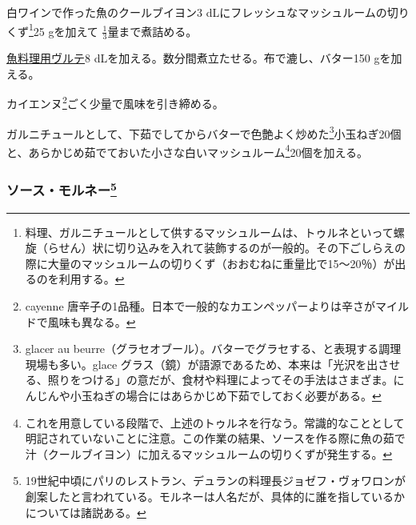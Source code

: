 \begin{recette}


白ワインで作った魚のクールブイヨン3
dLにフレッシュなマッシュルームの切りくず\footnote{料理、ガルニチュールとして供するマッシュルームは、トゥルネといって螺旋（らせん）状に切り込みを入れて装飾するのが一般的。その下ごしらえの際に大量のマッシュルームの切りくず（おおむねに重量比で15〜20％）が出るのを利用する。}25
gを加えて \(\frac{1}{3}\)量まで煮詰める。

\protect\hyperlink{veloute-de-poisson}{魚料理用ヴルテ}8
dLを加える。数分間煮立たせる。布で漉し、バター150 gを加える。

カイエンヌ\footnote{cayenne
  唐辛子の1品種。日本で一般的なカエンペッパーよりは辛さがマイルドで風味も異なる。}ごく少量で風味を引き締める。

ガルニチュールとして、下茹でしてからバターで色艶よく炒めた\footnote{glacer
  au
  beurre（グラセオブール）。バターでグラセする、と表現する調理現場も多い。glace
  グラス（鏡）が語源であるため、本来は「光沢を出させる、照りをつける」の意だが、食材や料理によってその手法はさまざま。にんじんや小玉ねぎの場合にはあらかじめ下茹でしておく必要がある。}小玉ねぎ20個と、あらかじめ茹でておいた小さな白いマッシュルーム\footnote{これを用意している段階で、上述のトゥルネを行なう。常識的なこととして明記されていないことに注意。この作業の結果、ソースを作る際に魚の茹で汁（クールブイヨン）に加えるマッシュルームの切りくずが発生する。}20個を加える。

\hypertarget{sauce-mornay}{%
\subsubsection[ソース・モルネー]{\texorpdfstring{ソース・モルネー\footnote{19世紀中頃にパリのレストラン、デュランの料理長ジョゼフ・ヴォワロンが創案したと言われている。モルネーは人名だが、具体的に誰を指しているかについては諸説ある。}}{ソース・モルネー}}\label{sauce-mornay}}




\end{recette}

